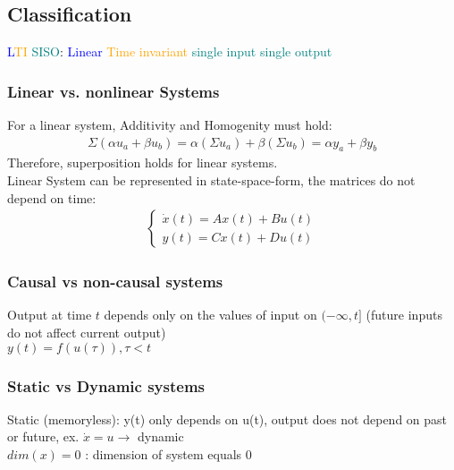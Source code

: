 \subsection{Classification}
    \textcolor{blue}{L}\textcolor{orange}{TI} \textcolor{teal}{SISO}: \textcolor{blue}{Linear} \textcolor{orange}{Time invariant} \textcolor{teal}{single input single output}
    \subsubsection*{Linear vs. nonlinear Systems}
        For a linear system, Additivity and Homogenity must hold:
        \begin{align*}
            \Sigma (\alpha u_a + \beta u_b) = \alpha (\Sigma u_a) + \beta (\Sigma u_b) = \alpha y_a + \beta y_b
        \end{align*}
        Therefore, superposition holds for linear systems.\\
        Linear System can be represented in state-space-form, the matrices do not depend on time:
        \begin{align*}\label{eqn:LTI}
            \begin{cases}
                \dot{x}(t) = Ax(t) + Bu(t)\\
                y(t) = Cx(t) + Du(t)
            \end{cases}
        \end{align*}

    \subsubsection*{Causal vs non-causal systems}
        Output at time $t$ depends only on the values of input on $(-\infty, t]$ (future inputs do not affect current output)\\
        $y(t) = f(u(\tau)), \tau < t$
    
    \subsubsection*{Static vs Dynamic systems}
        Static (memoryless):
        y(t) only depends on u(t), output does not depend on past or future, ex. $\dot{x} = u \rightarrow$ dynamic\\
        $dim(x) = 0$ : dimension of system equals 0

